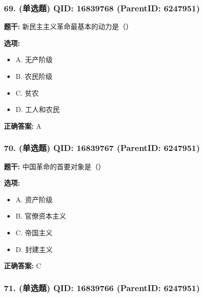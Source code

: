 \documentclass[12pt,UTF8]{ctexart}
\begin{document}
\subsubsection*{69. (单选题) \small QID: 16839768 (ParentID: 6247951)}

\textbf{题干:}
新民主主义革命最基本的动力是（）



\textbf{选项:}
\begin{itemize}[leftmargin=*]

  \item A. 无产阶级

  \item B. 农民阶级

  \item C. 贫农

  \item D. 工人和农民

\end{itemize}

\textbf{正确答案:}
A

\vspace{0.3em}\hrulefill\vspace{0.7em}

\subsubsection*{70. (单选题) \small QID: 16839767 (ParentID: 6247951)}

\textbf{题干:}
中国革命的首要对象是（）



\textbf{选项:}
\begin{itemize}[leftmargin=*]

  \item A. 资产阶级

  \item B. 官僚资本主义

  \item C. 帝国主义

  \item D. 封建主义

\end{itemize}

\textbf{正确答案:}
C

\vspace{0.3em}\hrulefill\vspace{0.7em}

\subsubsection*{71. (单选题) \small QID: 16839766 (ParentID: 6247951)}
\end{document}
